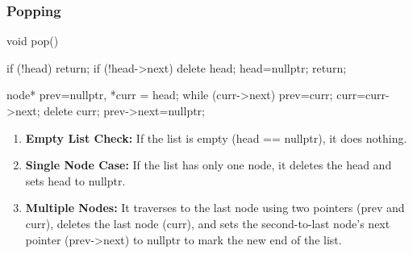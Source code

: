 \documentclass{report}
\begin{document}
    \pagebreak 
    \subsubsection{Popping}
    \bigbreak \noindent 
    \begin{cppcode}
        void pop() {
            if (!head) return;
            if (!head->next) {
                delete head;
                head=nullptr;
                return;
            }

            node* prev=nullptr, *curr = head;
            while (curr->next) {
                prev=curr;
                curr=curr->next;
            }
            delete curr;
            prev->next=nullptr;
        }
    \end{cppcode}
    \bigbreak \noindent 
    \begin{enumerate}
        \item \textbf{Empty List Check:} If the list is empty (head == nullptr), it does nothing.
        \item \textbf{Single Node Case:} If the list has only one node, it deletes the head and sets head to nullptr.
        \item \textbf{Multiple Nodes:} It traverses to the last node using two pointers (prev and curr), deletes the last node (curr), and sets the second-to-last node's next pointer (prev->next) to nullptr to mark the new end of the list.
    \end{enumerate}

    \pagebreak 
\end{document}

